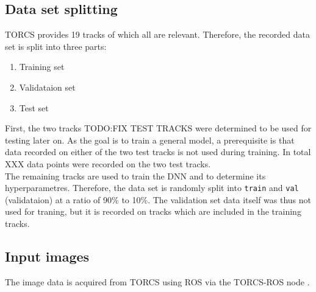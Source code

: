\documentclass[10pt,a4paper,twoside,journal]{IEEEtran}
\begin{document}

\subsection{Data set splitting}
\label{ssc:data-set-split}
TORCS provides 19 tracks of which all are relevant. Therefore, the recorded data set is split into three parts: 
\begin{enumerate}
	\item Training set
	\item Validataion set
	\item Test set
\end{enumerate}
First, the two tracks TODO:FIX TEST TRACKS were determined to be used for testing later on. As the goal is to train a general model, a prerequisite is that data recorded on either of the two test tracks is not used during training. In total XXX data points were recorded on the two test tracks. \\
The remaining tracks are used to train the DNN and to determine its hyperparametres. Therefore, the data set is randomly split into \texttt{train} and \texttt{val} (validataion) at a ratio of 90\% to 10\%. The validation set data itself was thus not used for traning, but it is recorded on tracks which are included in the training tracks.

\subsection{Input images}
The image data is acquired from TORCS \cite{TORCS} using ROS via the TORCS-ROS node \cite{mirus_torcs-ros_2017}. 
\end{document}
